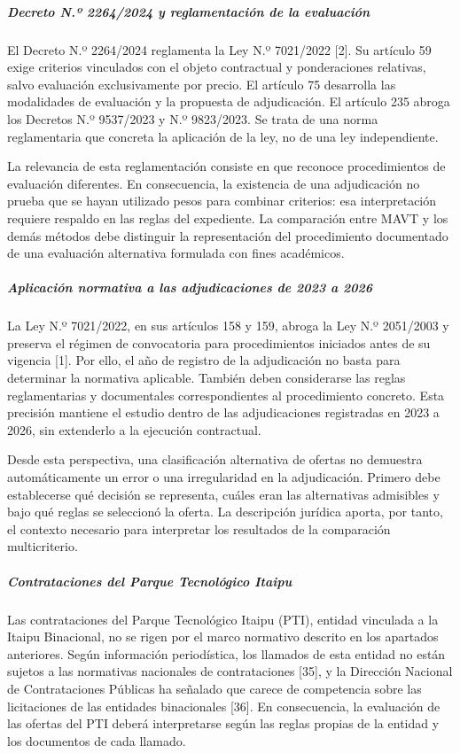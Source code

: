\documentclass[12pt,a4paper]{article}
\begin{document}
\subparagraph{Decreto N.º 2264/2024 y reglamentación de la evaluación}

El Decreto N.º 2264/2024 reglamenta la Ley N.º 7021/2022 [2]. Su artículo 59 exige criterios vinculados con el objeto contractual y ponderaciones relativas, salvo evaluación exclusivamente por precio. El artículo 75 desarrolla las modalidades de evaluación y la propuesta de adjudicación. El artículo 235 abroga los Decretos N.º 9537/2023 y N.º 9823/2023. Se trata de una norma reglamentaria que concreta la aplicación de la ley, no de una ley independiente.

La relevancia de esta reglamentación consiste en que reconoce procedimientos de evaluación diferentes. En consecuencia, la existencia de una adjudicación no prueba que se hayan utilizado pesos para combinar criterios: esa interpretación requiere respaldo en las reglas del expediente. La comparación entre MAVT y los demás métodos debe distinguir la representación del procedimiento documentado de una evaluación alternativa formulada con fines académicos.

\subparagraph{Aplicación normativa a las adjudicaciones de 2023 a 2026}

La Ley N.º 7021/2022, en sus artículos 158 y 159, abroga la Ley N.º 2051/2003 y preserva el régimen de convocatoria para procedimientos iniciados antes de su vigencia [1]. Por ello, el año de registro de la adjudicación no basta para determinar la normativa aplicable. También deben considerarse las reglas reglamentarias y documentales correspondientes al procedimiento concreto. Esta precisión mantiene el estudio dentro de las adjudicaciones registradas en 2023 a 2026, sin extenderlo a la ejecución contractual.

Desde esta perspectiva, una clasificación alternativa de ofertas no demuestra automáticamente un error o una irregularidad en la adjudicación. Primero debe establecerse qué decisión se representa, cuáles eran las alternativas admisibles y bajo qué reglas se seleccionó la oferta. La descripción jurídica aporta, por tanto, el contexto necesario para interpretar los resultados de la comparación multicriterio.

\subparagraph{Contrataciones del Parque Tecnológico Itaipu}

Las contrataciones del Parque Tecnológico Itaipu (PTI), entidad vinculada a la Itaipu Binacional, no se rigen por el marco normativo descrito en los apartados anteriores. Según información periodística, los llamados de esta entidad no están sujetos a las normativas nacionales de contrataciones [35], y la Dirección Nacional de Contrataciones Públicas ha señalado que carece de competencia sobre las licitaciones de las entidades binacionales [36]. En consecuencia, la evaluación de las ofertas del PTI deberá interpretarse según las reglas propias de la entidad y los documentos de cada llamado.
\end{document}
